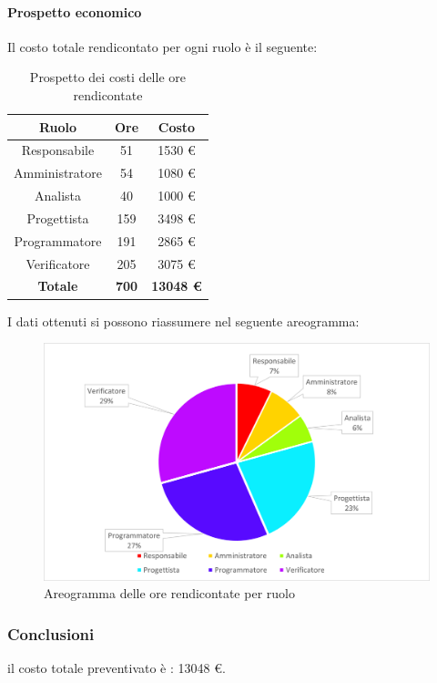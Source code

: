 \paragraph{Prospetto economico}
Il costo totale rendicontato per ogni ruolo è il seguente:
\begin{table}[H]
		\begin{center}
			\setlength{\aboverulesep}{0pt}
			\setlength{\belowrulesep}{0pt}
			\setlength{\extrarowheight}{.75ex}
			\begin{tabular}{ c c c }
				\rowcolor{AzzurroGruppo!30} 
				\textbf{Ruolo} & \textbf{Ore} & \textbf{Costo} \\
				\toprule
				Responsabile   & 51 & 1530 \euro \\
				Amministratore & 54 & 1080 \euro \\
				Analista       & 40 & 1000 \euro \\
				Progettista    & 159 & 3498 \euro \\
				Programmatore  & 191 & 2865 \euro \\
				Verificatore   & 205 & 3075 \euro \\
				\textbf{Totale} & \textbf{700} & \textbf{13048 \euro} \\
				\bottomrule
			\end{tabular}
			\caption{Prospetto dei costi delle ore rendicontate}
		\end{center}
	\end{table}
I dati ottenuti si possono riassumere nel seguente areogramma:
\begin{figure}[H]
    \centering
    \includegraphics[scale = 0.5]{components/img/Totale-rendicontate-torta.png}
    \caption{ Areogramma delle ore rendicontate per ruolo}
    \label{fig:Areogramma ripartizione ore totali rendicontate}
\end{figure}
\subsubsection{Conclusioni}
il costo totale preventivato è : 13048 \euro .